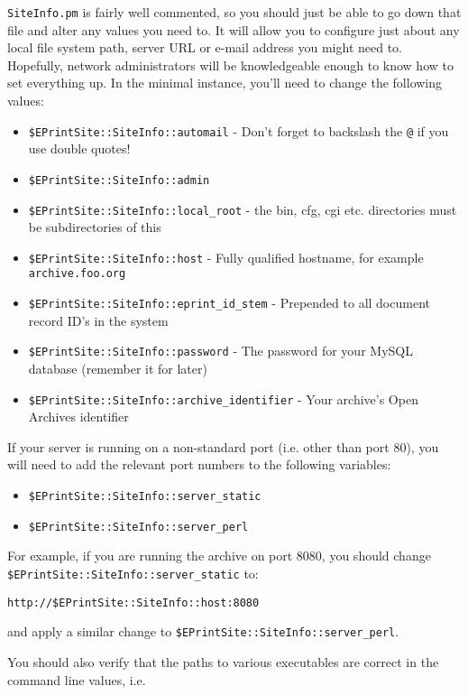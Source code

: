{\tt SiteInfo.pm} is fairly well commented, so you should just be able to go down that file and alter any values you need to. It will allow you to configure just about any local file system path, server URL or e-mail address you might need to. Hopefully, network administrators will be knowledgeable enough to know how to set everything up. In the minimal instance, you'll need to change the following values:

\begin{itemize}
\item {\tt \$EPrintSite::SiteInfo::automail} - Don't forget to backslash the {\tt @} if you use double quotes!
\item {\tt \$EPrintSite::SiteInfo::admin}
\item {\tt \$EPrintSite::SiteInfo::local\_root} - the bin, cfg, cgi etc. directories must be subdirectories of this
\item {\tt \$EPrintSite::SiteInfo::host} - Fully qualified hostname, for example {\tt archive.foo.org}
\item {\tt \$EPrintSite::SiteInfo::eprint\_id\_stem} - Prepended to all document record ID's in the system
\item {\tt \$EPrintSite::SiteInfo::password} - The password for your MySQL database (remember it for later)
\item {\tt \$EPrintSite::SiteInfo::archive\_identifier} - Your archive's Open Archives identifier
\end{itemize}

If your server is running on a non-standard port (i.e. other than port 80), you will need to add the relevant port numbers to the following variables:

\begin{itemize}
\item {\tt \$EPrintSite::SiteInfo::server\_static}
\item {\tt \$EPrintSite::SiteInfo::server\_perl}
\end{itemize}

For example, if you are running the archive on port 8080, you should change {\tt \$EPrintSite::SiteInfo::server\_static} to:

{\tt http://\$EPrintSite::SiteInfo::host:8080}

and apply a similar change to {\tt \$EPrintSite::SiteInfo::server\_perl}.

You should also verify that the paths to various executables are correct in the command line values, i.e.

